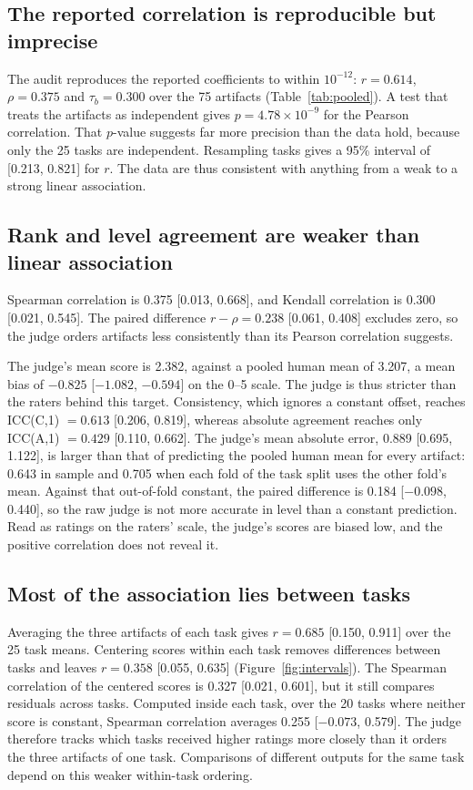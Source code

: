 \subsection{The reported correlation is reproducible but imprecise}
The audit reproduces the reported coefficients to within $10^{-12}$: $r=0.614$, $\rho=0.375$ and $\tau_b=0.300$ over the 75 artifacts (Table~\ref{tab:pooled}).
A test that treats the artifacts as independent gives $p=4.78\times10^{-9}$ for the Pearson correlation.
That $p$-value suggests far more precision than the data hold, because only the 25 tasks are independent.
Resampling tasks gives a 95\% interval of [0.213, 0.821] for $r$.
The data are thus consistent with anything from a weak to a strong linear association.

\subsection{Rank and level agreement are weaker than linear association}
Spearman correlation is 0.375 [0.013, 0.668], and Kendall correlation is 0.300 [0.021, 0.545].
The paired difference $r-\rho=0.238$ [0.061, 0.408] excludes zero, so the judge orders artifacts less consistently than its Pearson correlation suggests.

The judge's mean score is 2.382, against a pooled human mean of 3.207, a mean bias of $-0.825$ [$-1.082$, $-0.594$] on the 0--5 scale.
The judge is thus stricter than the raters behind this target.
Consistency, which ignores a constant offset, reaches ICC(C,1) $=0.613$ [0.206, 0.819], whereas absolute agreement reaches only ICC(A,1) $=0.429$ [0.110, 0.662].
The judge's mean absolute error, 0.889 [0.695, 1.122], is larger than that of predicting the pooled human mean for every artifact: 0.643 in sample and 0.705 when each fold of the task split uses the other fold's mean.
Against that out-of-fold constant, the paired difference is 0.184 [$-0.098$, 0.440], so the raw judge is not more accurate in level than a constant prediction.
Read as ratings on the raters' scale, the judge's scores are biased low, and the positive correlation does not reveal it.

\subsection{Most of the association lies between tasks}
Averaging the three artifacts of each task gives $r=0.685$ [0.150, 0.911] over the 25 task means.
Centering scores within each task removes differences between tasks and leaves $r=0.358$ [0.055, 0.635] (Figure~\ref{fig:intervals}).
The Spearman correlation of the centered scores is 0.327 [0.021, 0.601], but it still compares residuals across tasks.
Computed inside each task, over the 20 tasks where neither score is constant, Spearman correlation averages 0.255 [$-0.073$, 0.579].
The judge therefore tracks which tasks received higher ratings more closely than it orders the three artifacts of one task.
Comparisons of different outputs for the same task depend on this weaker within-task ordering.

